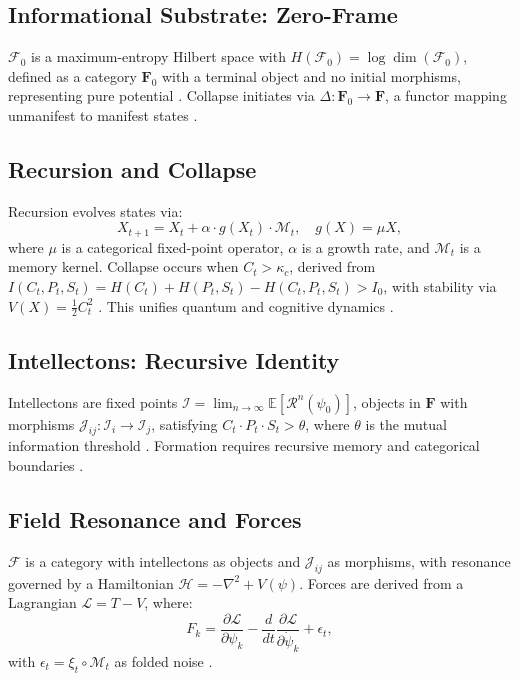 \documentclass[11pt]{article}
\newcommand{\field}[1]{\mathcal{#1}}
\newcommand{\intellecton}{\mathcal{I}} %
\newcommand{\expect}{\mathbb{E}}
\newcommand{\cat}[1]{\mathbf{#1}} %
\begin{document}
\subsection{Informational Substrate: Zero-Frame}
$\field{F}_0$ is a maximum-entropy Hilbert space with $H(\field{F}_0) = \log \dim(\field{F}_0)$, defined as a category $\cat{F}_0$ with a terminal object and no initial morphisms, representing pure potential \citep{zurek2003, plotinus2020}. Collapse initiates via $\Delta: \cat{F}_0 \to \cat{F}$, a functor mapping unmanifest to manifest states \citep{wolfram2020}.

\subsection{Recursion and Collapse}
Recursion evolves states via:
\begin{equation}
X_{t+1} = X_t + \alpha \cdot g(X_t) \cdot \mathcal{M}_t, \quad g(X) = \mu X,
\label{eq:recursion}
\end{equation}
where $\mu$ is a categorical fixed-point operator, $\alpha$ is a growth rate, and $\mathcal{M}_t$ is a memory kernel. Collapse occurs when $C_t > \kappa_c$, derived from $I(C_t, P_t, S_t) = H(C_t) + H(P_t, S_t) - H(C_t, P_t, S_t) > I_0$, with stability via $V(X) = \frac{1}{2} C_t^2$ \citep{penrose2024}. This unifies quantum \citep{rovelli2023} and cognitive dynamics \citep{baars2023}.

\subsection{Intellectons: Recursive Identity}
Intellectons are fixed points $\intellecton = \lim_{n \to \infty} \expect[\mathcal{R}^n(\psi_0)]$, objects in $\cat{F}$ with morphisms $\mathcal{J}_{ij}: \intellecton_i \to \intellecton_j$, satisfying $C_t \cdot P_t \cdot S_t > \theta$, where $\theta$ is the mutual information threshold \citep{tononi2023, levin2024}. Formation requires recursive memory and categorical boundaries \citep{hofstadter1979}.

\subsection{Field Resonance and Forces}
$\field{F}$ is a category with intellectons as objects and $\mathcal{J}_{ij}$ as morphisms, with resonance governed by a Hamiltonian $\mathcal{H} = -\nabla^2 + V(\psi)$. Forces are derived from a Lagrangian $\mathcal{L} = T - V$, where:
\begin{equation}
F_k = \frac{\partial \mathcal{L}}{\partial \psi_k} - \frac{d}{dt} \frac{\partial \mathcal{L}}{\partial \dot{\psi}_k} + \epsilon_t,
\label{eq:force}
\end{equation}
with $\epsilon_t = \xi_t \circ \mathcal{M}_t$ as folded noise \citep{susskind2023, verlinde2023}.
\end{document}
